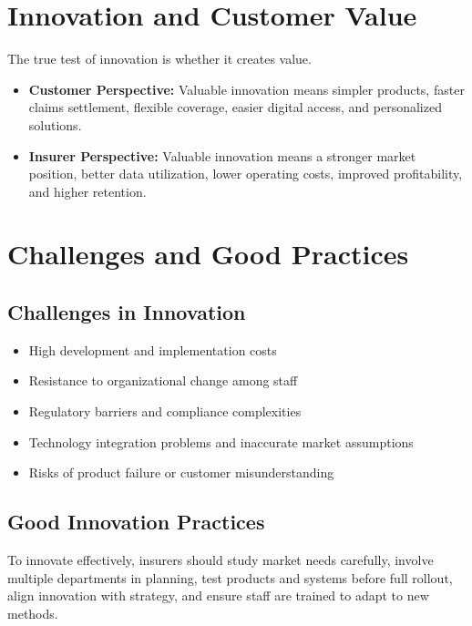 \documentclass[12pt,a4paper]{article}
\begin{document}
\section{Innovation and Customer Value}

The true test of innovation is whether it creates value. 
\begin{itemize}
    \item \textbf{Customer Perspective:} Valuable innovation means simpler products, faster claims settlement, flexible coverage, easier digital access, and personalized solutions.
    \item \textbf{Insurer Perspective:} Valuable innovation means a stronger market position, better data utilization, lower operating costs, improved profitability, and higher retention.
\end{itemize}

\section{Challenges and Good Practices}

\subsection{Challenges in Innovation}
\begin{itemize}
    \item High development and implementation costs
    \item Resistance to organizational change among staff
    \item Regulatory barriers and compliance complexities
    \item Technology integration problems and inaccurate market assumptions
    \item Risks of product failure or customer misunderstanding
\end{itemize}

\subsection{Good Innovation Practices}
To innovate effectively, insurers should study market needs carefully, involve multiple departments in planning, test products and systems before full rollout, align innovation with strategy, and ensure staff are trained to adapt to new methods.
\end{document}
